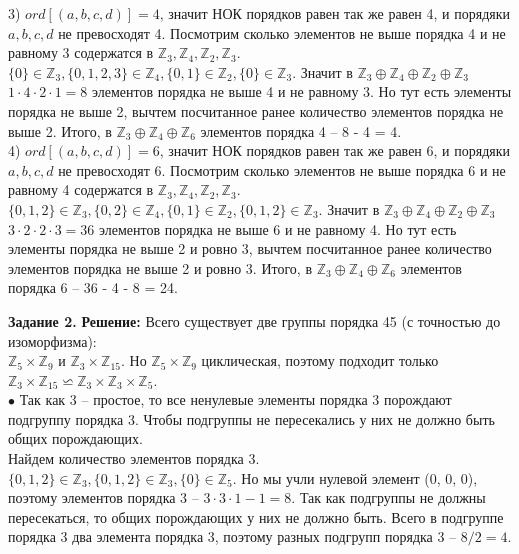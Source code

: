 \documentclass[12pt,a4paper]{scrartcl}
\begin{document}
		3) $ord[(a, b, c, d)] = 4$, значит НОК порядков равен так же равен 4, и порядяки $a, b, c, d$ не превосходят 4. Посмотрим сколько элементов не выше порядка 4 и не равному 3 содержатся в $\mathbb{Z}_3, \mathbb{Z}_4, \mathbb{Z}_2, \mathbb{Z}_3$. \\
		$\{0\} \in \mathbb{Z}_3, \{0, 1, 2, 3\} \in \mathbb{Z}_4, \{0, 1\} \in \mathbb{Z}_2, \{0\} \in \mathbb{Z}_3$. Значит в $\mathbb{Z}_3 \oplus \mathbb{Z}_4 \oplus \mathbb{Z}_2 \oplus \mathbb{Z}_3$ $1 \cdot 4 \cdot 2 \cdot 1 = 8$ элементов порядка не выше 4 и не равному 3. Но тут есть элементы порядка не выше 2, вычтем посчитанное ранее количество элементов порядка не выше 2. Итого, в $\mathbb{Z}_3 \oplus \mathbb{Z}_4 \oplus \mathbb{Z}_6$ элементов порядка 4 -- 8 - 4 = 4.\\
		
		4) $ord[(a, b, c, d)] = 6$, значит НОК порядков равен так же равен 6, и порядяки $a, b, c, d$ не превосходят 6. Посмотрим сколько элементов не выше порядка 6 и не равному 4 содержатся в $\mathbb{Z}_3, \mathbb{Z}_4, \mathbb{Z}_2, \mathbb{Z}_3$. \\
		$\{0, 1, 2\} \in \mathbb{Z}_3, \{0, 2\} \in \mathbb{Z}_4, \{0, 1\} \in \mathbb{Z}_2, \{0, 1, 2\} \in \mathbb{Z}_3$. Значит в $\mathbb{Z}_3 \oplus \mathbb{Z}_4 \oplus \mathbb{Z}_2 \oplus \mathbb{Z}_3$ $3 \cdot 2 \cdot 2 \cdot 3 = 36$ элементов порядка не выше 6 и не равному 4. Но тут есть элементы порядка не выше 2 и ровно 3, вычтем посчитанное ранее количество элементов порядка не выше 2 и ровно 3. Итого, в $\mathbb{Z}_3 \oplus \mathbb{Z}_4 \oplus \mathbb{Z}_6$ элементов порядка 6 -- 36 - 4 - 8 = 24.\\
				
	\begin{flushright}	
		\textbf{}
	\end{flushright}
	\newpage
	\noindent
	\textbf{Задание 2.} 
	\newline
	\textbf{Решение:} 
	\newline
	\indent
	Всего существует две группы порядка 45 (с точностью до изоморфизма): \\
	$\mathbb{Z}_5 \times \mathbb{Z}_9$ и $\mathbb{Z}_3 \times \mathbb{Z}_{15}$. Но $\mathbb{Z}_5 \times \mathbb{Z}_9$ циклическая, поэтому подходит только $\mathbb{Z}_3 \times \mathbb{Z}_{15} \backsimeq \mathbb{Z}_3 \times \mathbb{Z}_3 \times \mathbb{Z}_5$. \\
	
	$\bullet$ Так как 3 -- простое, то все ненулевые элементы порядка 3 порождают подгруппу порядка 3. Чтобы подгруппы не пересекались у них не должно быть общих порождающих.  \\
	Найдем количество элементов порядка 3. \\
	$\{0, 1, 2\} \in \mathbb{Z}_3, \{0, 1, 2\} \in \mathbb{Z}_3, \{0\} \in \mathbb{Z}_5$. Но мы учли нулевой элемент (0, 0, 0), поэтому элементов порядка 3 -- $3 \cdot 3 \cdot 1 - 1 = 8$. Так как подгруппы не должны пересекаться, то общих порождающих у них не должно быть. Всего в подгруппе порядка 3 два элемента порядка 3, поэтому разных подгрупп порядка 3 -- $8 / 2 = 4$.\\
	
\end{document}
